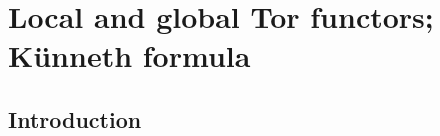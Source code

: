 \section{Local and global Tor functors; K\"unneth formula}
\label{section:3.6}


\subsection{Introduction}
\label{subsection:3.6.1}


















